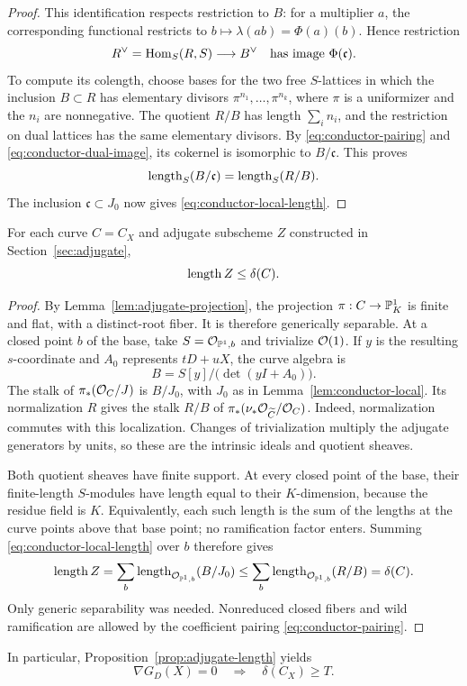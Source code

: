 \begin{proof}
This identification respects restriction to \(B\): for a multiplier \(a\),
the corresponding functional restricts to
\(b\mapsto\lambda(ab)=\Phi(a)(b)\).
Hence restriction
\begin{equation}
 R^\vee=\operatorname{Hom}_S(R,S)\longrightarrow B^\vee
 \quad\hbox{has image }\Phi(\mathfrak c).
 \label{eq:conductor-dual-image}
\end{equation}
To compute its colength, choose bases for the two free \(S\)-lattices
in which the inclusion \(B\subset R\) has elementary divisors
\(\pi^{n_1},\ldots,\pi^{n_k}\), where \(\pi\) is a uniformizer and
the \(n_i\) are nonnegative.  The quotient \(R/B\) has length
\(\sum_i n_i\), and the restriction on dual lattices has the same
elementary divisors.  By \eqref{eq:conductor-pairing} and
\eqref{eq:conductor-dual-image}, its cokernel is isomorphic to
\(B/\mathfrak c\).  This proves
\[
 \operatorname{length}_S(B/\mathfrak c)=\operatorname{length}_S(R/B).
\]
The inclusion \(\mathfrak c\subset J_0\) now gives
\eqref{eq:conductor-local-length}.
\end{proof}

\begin{proposition}
\label{prop:conductor-length}
For each curve \(C=C_X\) and adjugate subscheme \(Z\) constructed in
Section~\ref{sec:adjugate},
\begin{equation}
 \operatorname{length} Z\le\delta(C).
 \label{eq:conductor-global-length}
\end{equation}
\end{proposition}

\begin{proof}
By Lemma~\ref{lem:adjugate-projection}, the projection
\(\pi:C\to\mathbb P^1_K\) is finite and flat, with a distinct-root fiber.
It is therefore generically separable.  At a closed point \(b\) of the
base, take \(S=\mathcal O_{\mathbb P^1,b}\) and trivialize \(\mathcal O(1)\).
If \(y\) is the resulting \(s\)-coordinate and \(A_0\) represents
\(tD+uX\), the curve algebra is
\[
 B=S[y]/\bigl(\det(yI+A_0)\bigr).
\]
The stalk of \(\pi_*(\mathcal O_C/J)\) is \(B/J_0\), with \(J_0\) as in
Lemma~\ref{lem:conductor-local}.  Its normalization \(R\) gives the
stalk \(R/B\) of
\(\pi_*(\nu_*\mathcal O_{\widetilde C}/\mathcal O_C)\).
Indeed, normalization commutes with this localization.
Changes of trivialization multiply the adjugate generators by units,
so these are the intrinsic ideals and quotient sheaves.

Both quotient sheaves have finite support.  At every closed point of
the base, their finite-length \(S\)-modules have length equal to their
\(K\)-dimension, because the residue field is \(K\).
Equivalently, each such length is the sum of the lengths at the curve
points above that base point; no ramification factor enters.
Summing \eqref{eq:conductor-local-length} over \(b\) therefore gives
\[
 \operatorname{length} Z
 =\sum_b\operatorname{length}_{\mathcal O_{\mathbb P^1,b}}(B/J_0)
 \le
 \sum_b\operatorname{length}_{\mathcal O_{\mathbb P^1,b}}(R/B)
 =\delta(C).
\]
Only generic separability was needed.  Nonreduced closed fibers and
wild ramification are allowed by the coefficient pairing
\eqref{eq:conductor-pairing}.
\end{proof}

In particular, Proposition~\ref{prop:adjugate-length} yields
\begin{equation}
 \nabla G_D(X)=0
 \quad\Longrightarrow\quad
 \delta(C_X)\ge T.
 \label{eq:conductor-gradient-defect}
\end{equation}
